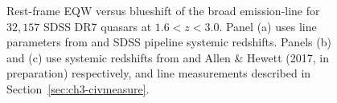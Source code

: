 \begin{figure}
    \captionsetup[subfigure]{labelformat=empty}  
    \centering 
    \subfloat[\label{fig:civ_space_z_compare_a}]{}
    \subfloat[\label{fig:civ_space_z_compare_b}]{}
    \subfloat[\label{fig:civ_space_z_compare_c}]{}
    \caption[{Rest-frame EQW versus blueshift of the broad  emission-line for SDSS quasars using three different redshift estimation schemes.}]{Rest-frame EQW versus blueshift of the broad  emission-line for $32,157$ SDSS DR$7$ quasars at $1.6 < z < 3.0$. Panel (a) uses  line parameters from \citet{shen11} and SDSS pipeline systemic redshifts. Panels (b) and (c) use systemic redshifts from \citet{hewett10} and Allen \& Hewett (2017, in preparation) respectively, and  line measurements described in Section~\ref{sec:ch3-civmeasure}.} 
    \label{fig:civ_space_z_compare}
\end{figure}

